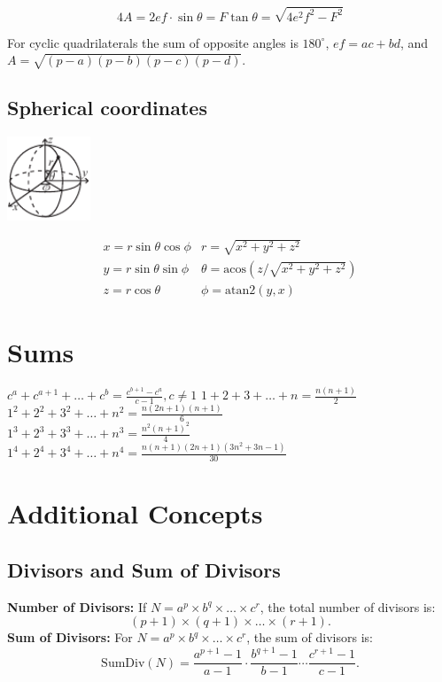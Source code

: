 \[ 4A = 2ef \cdot \sin\theta = F\tan\theta = \sqrt{4e^2f^2-F^2} \]

 For cyclic quadrilaterals the sum of opposite angles is $180^\circ$,
$ef = ac + bd$, and $A = \sqrt{(p-a)(p-b)(p-c)(p-d)}$.

\subsection{Spherical coordinates}
\begin{center}
\includegraphics[width=25mm]{content/math/sphericalCoordinates}
\end{center}
\[\begin{array}{cc}
x = r\sin\theta\cos\phi & r = \sqrt{x^2+y^2+z^2}\\
y = r\sin\theta\sin\phi & \theta = \textrm{acos}(z/\sqrt{x^2+y^2+z^2})\\
z = r\cos\theta & \phi = \textrm{atan2}(y,x)
\end{array}\]

\section{Sums}
$c^a + c^{a+1} + \dots + c^{b} = \frac{c^{b+1} - c^a}{c-1}, c \neq 1$
$1 + 2 + 3 + \dots + n = \frac{n(n+1)}{2}$ \\
$1^2 + 2^2 + 3^2 + \dots + n^2 = \frac{n(2n+1)(n+1)}{6}$\\
$1^3 + 2^3 + 3^3 + \dots + n^3 = \frac{n^2(n+1)^2}{4}$ \\
$1^4 + 2^4 + 3^4 + \dots + n^4 = \frac{n(n+1)(2n+1)(3n^2 + 3n - 1)}{30}$ \\

\section{Additional Concepts}

\subsection{Divisors and Sum of Divisors}
    \textbf{Number of Divisors:}  
    If \( N = a^p \times b^q \times \dots \times c^r \), the total number of divisors is:  
    \[
    (p+1) \times (q+1) \times \dots \times (r+1).
    \]  
    \textbf{Sum of Divisors:}  
    For \( N = a^p \times b^q \times \dots \times c^r \), the sum of divisors is:  
    \[
    \text{SumDiv}(N) = \frac{a^{p+1} - 1}{a-1} \cdot \frac{b^{q+1} - 1}{b-1} \cdots \frac{c^{r+1} - 1}{c-1}.
    \]  


